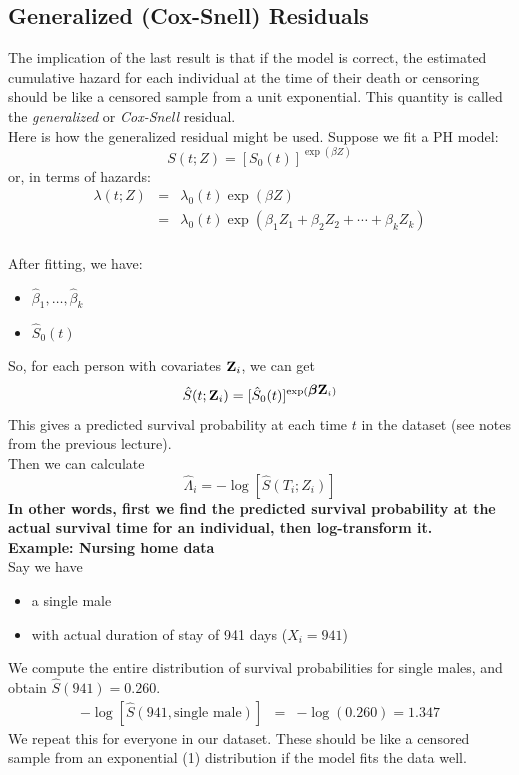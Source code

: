 \documentclass[11pt]{book}
\newcommand{\bfbeta}{{\mbox{\boldmath$\beta$}}}
\newcommand{\bfZ}{{\mbox{{\bf Z}}}}
\begin{document}
\subsection{Generalized (Cox-Snell) Residuals}
The implication of the last result is that if the model is correct, the
estimated cumulative hazard for each individual at the time of
their death or censoring should be like a censored sample from
a unit exponential.  This quantity is called the {\em generalized}
or {\em Cox-Snell} residual.
\\[2ex]
Here is how the generalized residual might be used. Suppose we fit a PH
model:
\[S(t;Z)=[S_0(t)]^{\exp(\beta Z)}\]
or, in terms of hazards:
\begin{eqnarray*}
\lambda(t;Z) & = &\lambda_0(t)\exp(\beta Z)\\
& = & \lambda_0(t)\exp(\beta_1 Z_1+\beta_2 Z_2+ \cdots + \beta_k Z_k)
\end{eqnarray*}
~\\
After fitting, we have:
\begin{itemize}
\item $\hat{\beta}_1,\ldots,\hat{\beta}_k$
\item $\hat{S}_0(t)$
\end{itemize}
So, for each person with covariates ${\bfZ_i}$, we can get
\[\hat{S}(t;{\bfZ_i})=[\hat{S}_0(t)]^{\exp(\bfbeta \bfZ_i)}\]
This gives a predicted survival probability at each time $t$
in the dataset (see notes from the previous lecture).
\\[2ex]
Then we can calculate
\[\hat{\Lambda}_i=-\log[\hat{S}(T_i;Z_i)]\]
{\bf In other words, first we find the predicted survival probability
at the actual survival time for an individual, then log-transform
it.}
\\[2ex]
{\bf Example:  Nursing home data}\\[2ex]
Say we have
\begin{itemize}
\item a single male
\item with actual duration of stay of 941 days ($X_i=941$)
\end{itemize}
We compute the entire distribution of survival probabilities
for single males, and obtain $\hat{S}(941)=0.260$.
\begin{eqnarray*}
-\log[\hat{S}(941,\mbox{single male})] & = & - \log(0.260) = 1.347
\end{eqnarray*}
We repeat this for everyone in our dataset.  These should be like a
censored sample from an exponential (1) distribution if
the model fits the data well.
\end{document}
